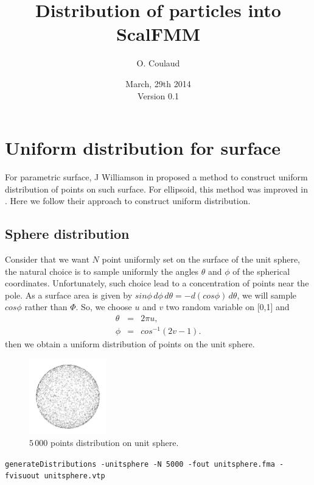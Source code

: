 \documentclass[10pt]{article}
\title{Distribution of particles into ScalFMM}
\author{O. Coulaud}
\date{March, 29th 2014\\\vspace{1cm}Version 0.1}
\begin{document}
\maketitle

\tableofcontents
\newpage
\section{Uniform distribution for surface}

For parametric surface, J  Williamson in \cite{Williamson} proposed a method to construct uniform distribution of points on such surface. For ellipsoid, this method was improved in \cite{ChenGlotzer}. Here we follow their approach to construct uniform distribution.

\subsection{Sphere distribution}
Consider that we want $N$ point uniformly set on the surface of the unit sphere, the natural choice is to sample uniformly the angles $\theta$ and $\phi$ of the spherical coordinates. Unfortunately, such choice lead to a concentration of points near the pole.  As a surface area is given by $sin\phi\,d\phi\,d\theta = -d(cos\phi)\,d\theta$, we will sample $cos\phi$ rather than $\Phi$. So, we choose $u$ and $v$ two  random variable on [0,1] and  
\begin{eqnarray*}
\theta	&=&	2\pi u,\\
\phi	&=&	cos^{-1}(2v-1).
\end{eqnarray*}
then we obtain a uniform distribution of points on the unit sphere.

\begin{figure}[ht]
  \centering
   \includegraphics[width=0.3\textwidth]{unitsphere}
    \caption{$5\,000$ points distribution on unit sphere.}%
\end{figure}
\texttt{generateDistributions -unitsphere   -N 5000 -fout unitsphere.fma -fvisuout unitsphere.vtp }
\end{document}
